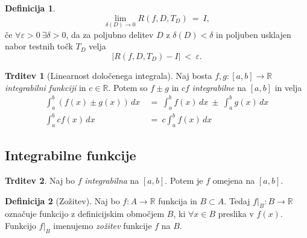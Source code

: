 \documentclass[11pt]{article}
\theoremstyle{definition}
\newtheorem{definicija}{Definicija}[section]
\theoremstyle{definition}
\newtheorem{trditev}{Trditev}[section]
\theoremstyle{definition}
\theoremstyle{theorem}
\begin{document}
\begin{definicija}

$$\lim_{\delta(D) \rightarrow 0} R(f, D, T_D) ~=~ I,$$
če $\forall \varepsilon > 0 ~ \exists \delta > 0$, da za poljubno delitev $D$ z $\delta(D) < \delta$ in poljuben usklajen nabor testnih točk $T_D$ velja
$$|R(f, D, T_D) - I| ~<~ \varepsilon.$$ 

\end{definicija}
\vspace{0.5cm}

\begin{trditev}[Linearnost določenega integrala]

Naj bosta $f, g: [a, b] \rightarrow \mathbb{R}$ \textit{integrabilni funkciji} in $c \in \mathbb{R}$. Potem so $f \pm g$ in $cf$ \textit{integrabilne} na $[a, b]$ in velja
\begin{align*}
\int_a^b \left( f(x) \pm g(x) \right)\,dx ~&=~ \int_a^b f(x)\,dx ~\pm~ \int_a^b g(x)\,dx \\
\int_a^b cf(x)\,dx ~&=~ c\int_a^b f(x)\,dx 
\end{align*}

\end{trditev}
\vspace{0.5cm}


\subsection{Integrabilne funkcije}
\vspace{0.5cm}

\begin{trditev}

Naj bo $f$ \textit{integrabilna} na $[a, b]$. Potem je $f$ omejena na $[a, b]$.

\end{trditev}
\vspace{0.5cm}

\begin{definicija}[Zožitev]

Naj bo $f:A \rightarrow \mathbb{R}$ funkcija in $B \subset A$. Tedaj $f |_B: B \rightarrow \mathbb{R}$ označuje funkcijo z definicijskim območjem $B$, ki $\forall x \in B$ preslika v $f(x)$. Funkcijo $f |_B$ imenujemo \textit{zožitev} funkcije $f$ na $B$.   

\end{definicija}
\vspace{0.5cm}
\end{document}
